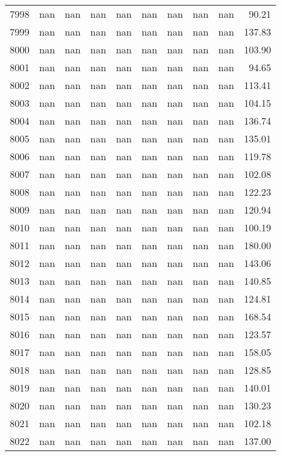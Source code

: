 \begin{tabular}{lrrrrrrrrr}
7998 & nan & nan & nan & nan & nan & nan & nan & nan & 90.21 \\
7999 & nan & nan & nan & nan & nan & nan & nan & nan & 137.83 \\
8000 & nan & nan & nan & nan & nan & nan & nan & nan & 103.90 \\
8001 & nan & nan & nan & nan & nan & nan & nan & nan & 94.65 \\
8002 & nan & nan & nan & nan & nan & nan & nan & nan & 113.41 \\
8003 & nan & nan & nan & nan & nan & nan & nan & nan & 104.15 \\
8004 & nan & nan & nan & nan & nan & nan & nan & nan & 136.74 \\
8005 & nan & nan & nan & nan & nan & nan & nan & nan & 135.01 \\
8006 & nan & nan & nan & nan & nan & nan & nan & nan & 119.78 \\
8007 & nan & nan & nan & nan & nan & nan & nan & nan & 102.08 \\
8008 & nan & nan & nan & nan & nan & nan & nan & nan & 122.23 \\
8009 & nan & nan & nan & nan & nan & nan & nan & nan & 120.94 \\
8010 & nan & nan & nan & nan & nan & nan & nan & nan & 100.19 \\
8011 & nan & nan & nan & nan & nan & nan & nan & nan & 180.00 \\
8012 & nan & nan & nan & nan & nan & nan & nan & nan & 143.06 \\
8013 & nan & nan & nan & nan & nan & nan & nan & nan & 140.85 \\
8014 & nan & nan & nan & nan & nan & nan & nan & nan & 124.81 \\
8015 & nan & nan & nan & nan & nan & nan & nan & nan & 168.54 \\
8016 & nan & nan & nan & nan & nan & nan & nan & nan & 123.57 \\
8017 & nan & nan & nan & nan & nan & nan & nan & nan & 158.05 \\
8018 & nan & nan & nan & nan & nan & nan & nan & nan & 128.85 \\
8019 & nan & nan & nan & nan & nan & nan & nan & nan & 140.01 \\
8020 & nan & nan & nan & nan & nan & nan & nan & nan & 130.23 \\
8021 & nan & nan & nan & nan & nan & nan & nan & nan & 102.18 \\
8022 & nan & nan & nan & nan & nan & nan & nan & nan & 137.00 \\

\end{tabular}

